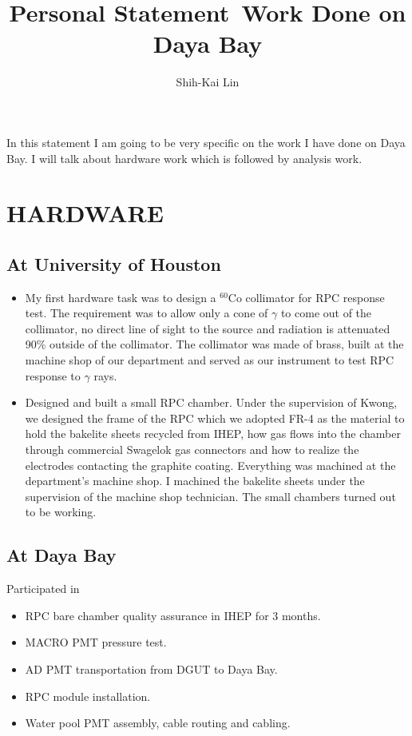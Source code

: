 \documentclass[10pt]{article}
\title{Personal Statement \textemdash \,Work Done on Daya Bay}
\date{}
\author{Shih-Kai Lin}
\begin{document}
\maketitle

In this statement I am going to be very specific on the work I have done on Daya Bay. I will talk about hardware work which is followed by analysis work.

\section*{HARDWARE}
\subsection*{At University of Houston}
\begin{itemize}
	\item My first hardware task was to design a $^{60}$Co collimator for RPC response test. The requirement was to allow only a cone of $\gamma$ to come out of the collimator, no direct line of sight to the source and radiation is attenuated 90\% outside of the collimator. The collimator was made of brass, built at the machine shop of our department and served as our instrument to test RPC response to $\gamma$ rays.
	\item Designed and built a small RPC chamber. Under the supervision of Kwong, we designed the frame of the RPC which we adopted FR-4 as the material to hold the bakelite sheets recycled from IHEP, how gas flows into the chamber through commercial Swagelok gas connectors and how to realize the electrodes contacting the graphite coating. Everything was machined at the department's machine shop. I machined the bakelite sheets under the supervision of the machine shop technician. The small chambers turned out to be working.
\end{itemize}

\subsection*{At Daya Bay}
Participated in
\begin{itemize}
	\item RPC bare chamber quality assurance in IHEP for 3 months.
	\item MACRO PMT pressure test.
	\item AD PMT transportation from DGUT to Daya Bay.
	\item RPC module installation.
	\item Water pool PMT assembly, cable routing and cabling.
\end{itemize}
\end{document}
